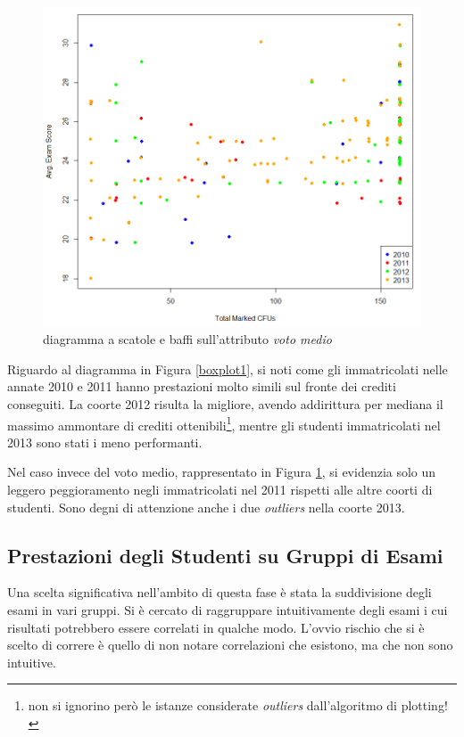             \begin{figure}
                \centering
                \caption{diagramma a scatole e baffi sull'attributo \textit{voto medio}}
                \label{boxplot2}
            	\includegraphics[scale=0.5]{img/scatter_plot_3.png}
            \end{figure}

            Riguardo al diagramma in Figura \ref{boxplot1}, si noti come gli immatricolati nelle annate 2010 e 2011 hanno prestazioni molto simili sul fronte dei crediti conseguiti. La coorte 2012 risulta la migliore, avendo addirittura per mediana il massimo ammontare di crediti ottenibili\footnote{non si ignorino però le istanze considerate \textit{outliers} dall’algoritmo di plotting!}, mentre gli studenti immatricolati nel 2013 sono stati i meno performanti.

            Nel caso invece del voto medio, rappresentato in Figura \ref{boxplot2}, si evidenzia solo un leggero peggioramento negli immatricolati nel 2011 rispetti alle altre coorti di studenti. Sono degni di attenzione anche i due \textit{outliers} nella coorte 2013.

        \subsection{Prestazioni degli Studenti su Gruppi di Esami}

            Una scelta significativa nell’ambito di questa fase è stata la suddivisione degli esami in vari gruppi. Si è cercato di raggruppare intuitivamente degli esami i cui risultati potrebbero essere correlati in qualche modo. L’ovvio rischio che si è scelto di correre è quello di non notare correlazioni che esistono, ma che non sono intuitive. \\

